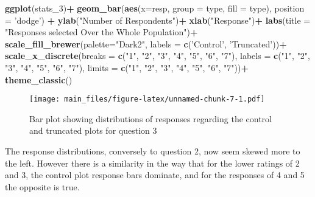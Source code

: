 \documentclass[
]{article}
\newenvironment{Shaded}{\begin{snugshade}}{\end{snugshade}}
\newcommand{\DataTypeTok}[1]{\textcolor[rgb]{0.13,0.29,0.53}{#1}}
\newcommand{\DecValTok}[1]{\textcolor[rgb]{0.00,0.00,0.81}{#1}}
\newcommand{\KeywordTok}[1]{\textcolor[rgb]{0.13,0.29,0.53}{\textbf{#1}}}
\newcommand{\NormalTok}[1]{#1}
\newcommand{\OperatorTok}[1]{\textcolor[rgb]{0.81,0.36,0.00}{\textbf{#1}}}
\newcommand{\StringTok}[1]{\textcolor[rgb]{0.31,0.60,0.02}{#1}}
\begin{document}
\begin{Shaded}
\begin{Highlighting}[]
\KeywordTok{ggplot}\NormalTok{(stats_}\DecValTok{3}\NormalTok{)}\OperatorTok{+}
\StringTok{  }\KeywordTok{geom_bar}\NormalTok{(}\KeywordTok{aes}\NormalTok{(}\DataTypeTok{x=}\NormalTok{resp, }\DataTypeTok{group =}\NormalTok{ type, }\DataTypeTok{fill =}\NormalTok{ type), }\DataTypeTok{position =} \StringTok{'dodge'}\NormalTok{) }\OperatorTok{+}
\StringTok{  }\KeywordTok{ylab}\NormalTok{(}\StringTok{"Number of Respondents"}\NormalTok{)}\OperatorTok{+}
\StringTok{  }\KeywordTok{xlab}\NormalTok{(}\StringTok{"Response"}\NormalTok{)}\OperatorTok{+}
\StringTok{  }\KeywordTok{labs}\NormalTok{(}\DataTypeTok{title =} \StringTok{"Responses selected Over the Whole Population"}\NormalTok{)}\OperatorTok{+}
\StringTok{  }\KeywordTok{scale_fill_brewer}\NormalTok{(}\DataTypeTok{palette=}\StringTok{"Dark2"}\NormalTok{, }\DataTypeTok{labels =} \KeywordTok{c}\NormalTok{(}\StringTok{'Control'}\NormalTok{, }\StringTok{'Truncated'}\NormalTok{))}\OperatorTok{+}
\StringTok{  }\KeywordTok{scale_x_discrete}\NormalTok{(}\DataTypeTok{breaks =} \KeywordTok{c}\NormalTok{(}\StringTok{"1"}\NormalTok{, }\StringTok{"2"}\NormalTok{, }\StringTok{"3"}\NormalTok{, }\StringTok{"4"}\NormalTok{, }\StringTok{"5"}\NormalTok{, }\StringTok{"6"}\NormalTok{, }\StringTok{"7"}\NormalTok{), }\DataTypeTok{labels =} \KeywordTok{c}\NormalTok{(}\StringTok{"1"}\NormalTok{, }\StringTok{"2"}\NormalTok{, }\StringTok{"3"}\NormalTok{, }\StringTok{"4"}\NormalTok{, }\StringTok{"5"}\NormalTok{, }\StringTok{"6"}\NormalTok{, }\StringTok{"7"}\NormalTok{), }\DataTypeTok{limits =} \KeywordTok{c}\NormalTok{(}\StringTok{"1"}\NormalTok{, }\StringTok{"2"}\NormalTok{, }\StringTok{"3"}\NormalTok{, }\StringTok{"4"}\NormalTok{, }\StringTok{"5"}\NormalTok{, }\StringTok{"6"}\NormalTok{, }\StringTok{"7"}\NormalTok{))}\OperatorTok{+}
\StringTok{  }\KeywordTok{theme_classic}\NormalTok{()}
\end{Highlighting}
\end{Shaded}

\begin{figure}
\centering
\texttt{[image: main\_files/figure-latex/unnamed-chunk-7-1.pdf]}
\caption{Bar plot showing distributions of responses regarding the
control and truncated plots for question 3}
\end{figure}

The response distributions, conversely to question 2, now seem skewed
more to the left. However there is a similarity in the way that for the
lower ratings of 2 and 3, the control plot response bars dominate, and
for the responses of 4 and 5 the opposite is true.
\end{document}
